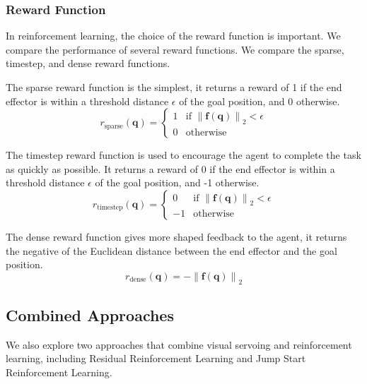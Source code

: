 \documentclass[letterpaper, 10 pt, conference]{ieeeconf}  %
\newcommand\norm[1]{\left\lVert#1\right\rVert}
\begin{document}
\subsubsection{Reward Function}

In reinforcement learning, the choice of the reward function is important.
We compare the performance of several reward functions. We compare the sparse,
timestep, and dense reward functions.

The sparse reward function is the simplest, it returns a reward of 1 if the
end effector is within a threshold distance $\epsilon$ of the goal position,
and 0 otherwise.
\begin{equation} \label{eq:sparse}
    r_{\text{sparse}}(\mathbf{q}) = \begin{cases}
        1 & \text{if } \norm{\mathbf{f}(\mathbf{q})}_2 < \epsilon \\
        0 & \text{otherwise}
    \end{cases}
\end{equation}

The timestep reward function is used to encourage the agent to complete the
task as quickly as possible. It returns a reward of 0 if the end effector is
within a threshold distance $\epsilon$ of the goal position, and -1 otherwise.
\begin{equation} \label{eq:timestep}
    r_{\text{timestep}}(\mathbf{q}) = \begin{cases}
        0 & \text{if } \norm{\mathbf{f}(\mathbf{q})}_2 < \epsilon \\
        -1 & \text{otherwise}
    \end{cases}
\end{equation}

The dense reward function gives more shaped feedback to the agent, it returns the
negative of the Euclidean distance between the end effector and the goal position.
\begin{equation} \label{eq:dense}
    r_{\text{dense}}(\mathbf{q}) = -\norm{\mathbf{f}(\mathbf{q})}_2
\end{equation}

\subsection{Combined Approaches}

We also explore two approaches that combine visual servoing and reinforcement
learning, including Residual Reinforcement Learning and Jump Start Reinforcement
Learning.
\end{document}
